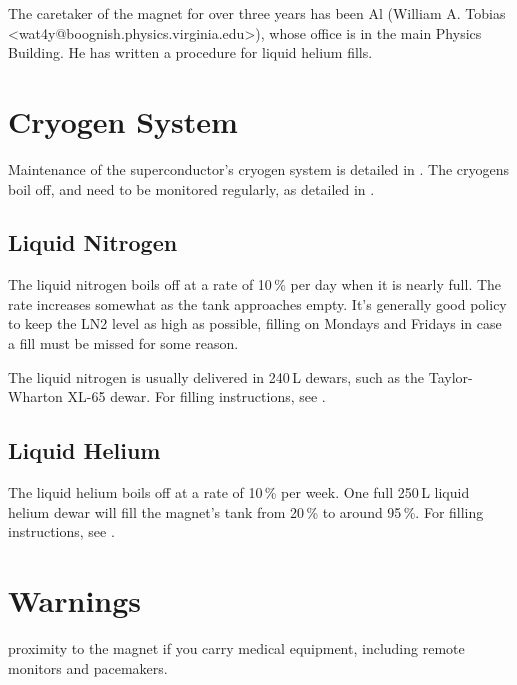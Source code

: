 The caretaker of the magnet for over three years has been Al (William A. Tobias\\<wat4y@boognish.physics.virginia.edu>), whose office is in the main Physics Building.  He has written a procedure for liquid helium fills.

\section{Cryogen System}
\label{sec:op_magnet:cryogens}

Maintenance of the superconductor's cryogen system is detailed in .  The cryogens boil off, and need to be monitored regularly, as detailed in .

\subsection{Liquid Nitrogen}
\label{sec:op_magnet:cryogens:ln2}

The liquid nitrogen boils off at a rate of 10\,\% per day when it is nearly full.  The rate increases somewhat as the tank approaches empty.  It's generally good policy to keep the LN2 level as high as possible, filling on Mondays and Fridays in case a fill must be missed for some reason.

The liquid nitrogen is usually delivered in 240\,L dewars, such as the Taylor-Wharton XL-65 dewar.  For filling instructions, see .

\subsection{Liquid Helium}
\label{sec:op_magnet:cryogens:lhe}

The liquid helium boils off at a rate of 10\,\% per week.  One full 250\,L liquid helium dewar will fill the magnet's tank from 20\,\% to around 95\,\%.  For filling instructions, see .


\section{Warnings}
\label{sec:eq_magnet}


\begin{avoid} proximity to the magnet if you carry medical equipment, including remote monitors and pacemakers.\end{avoid}

